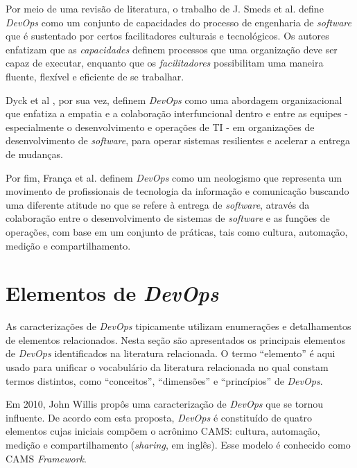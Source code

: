 Por meio de uma revisão de literatura, o trabalho de J. Smeds et al.
\cite{devops_a_definition} define \textit{DevOps} como um conjunto de
capacidades do processo de engenharia de \textit{software} que é sustentado
por certos facilitadores culturais e tecnológicos. Os autores enfatizam
que as \emph{capacidades} definem processos que uma organização deve ser capaz
de executar, enquanto que os \emph{facilitadores} possibilitam uma maneira
fluente, flexível e eficiente de se trabalhar.

Dyck et al \cite{towards_definitions}, por sua vez, definem \textit{DevOps}
como uma abordagem organizacional que enfatiza a empatia e a colaboração
interfuncional dentro e entre as equipes - especialmente o desenvolvimento e
operações de TI - em organizações de desenvolvimento de \textit{software}, para
operar sistemas resilientes e acelerar a entrega de mudanças.

Por fim, França et al. \cite{characterizing_devops} definem \textit{DevOps}
como um neologismo que representa um movimento de profissionais de tecnologia
da informação e comunicação buscando uma diferente atitude no que se refere à
entrega de \textit{software}, através da colaboração entre o desenvolvimento de
sistemas de \textit{software} e as funções de operações, com base em um conjunto
de práticas, tais como cultura, automação, medição e compartilhamento.

\section{Elementos de \textit{DevOps}}\label{secao_elementos_devops}

As caracterizações de \textit{DevOps} tipicamente utilizam enumerações e
detalhamentos de elementos relacionados. Nesta seção são apresentados os
principais elementos de \textit{DevOps} identificados na literatura relacionada.
O termo ``elemento'' é aqui usado para unificar o vocabulário da literatura
relacionada no qual constam termos distintos, como ``conceitos'', ``dimensões''
e ``princípios'' de \textit{DevOps}.

Em 2010, John Willis propôs uma caracterização de \textit{DevOps}
\cite{what_devops_means_2010} que se tornou influente. De acordo com esta
proposta, \textit{DevOps} é constituído de quatro elementos cujas iniciais
compõem o acrônimo \acrshort{CAMS}: cultura, automação, medição e compartilhamento
(\textit{sharing}, em inglês). Esse modelo é conhecido como \acrshort{CAMS}
\textit{Framework}.

